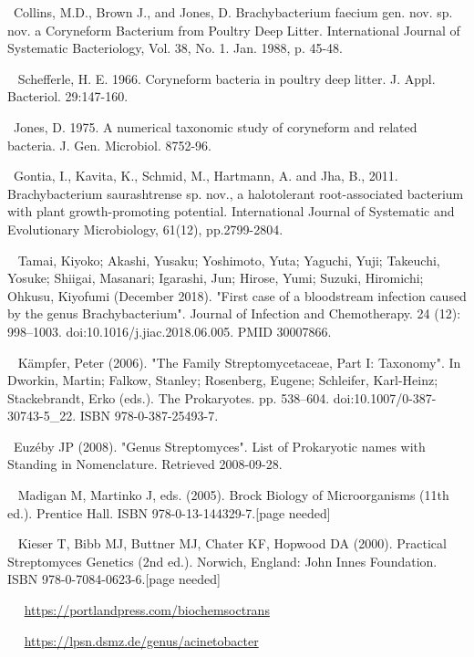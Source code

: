 \documentclass[11pt]{article}
\begin{document}
\begin{thebibliography}{3}
	~Collins, M.D., Brown J., and Jones, D. Brachybacterium faecium gen. nov. sp. nov. a Coryneform Bacterium from Poultry Deep Litter. International Journal of Systematic Bacteriology, Vol. 38, No. 1. Jan. 1988, p. 45-48.
	
	~ Schefferle, H. E. 1966. Coryneform bacteria in poultry deep litter. J. Appl. Bacteriol. 29:147-160.
	
	~Jones, D. 1975. A numerical taxonomic study of coryneform and related bacteria. J. Gen. Microbiol. 8752-96.
	
	~Gontia, I., Kavita, K., Schmid, M., Hartmann, A. and Jha, B., 2011. Brachybacterium saurashtrense sp. nov., a halotolerant root-associated bacterium with plant growth-promoting potential. International Journal of Systematic and Evolutionary Microbiology, 61(12), pp.2799-2804.
	
	~ Tamai, Kiyoko; Akashi, Yusaku; Yoshimoto, Yuta; Yaguchi, Yuji; Takeuchi, Yosuke; Shiigai, Masanari; Igarashi, Jun; Hirose, Yumi; Suzuki, Hiromichi; Ohkusu, Kiyofumi (December 2018). "First case of a bloodstream infection caused by the genus Brachybacterium". Journal of Infection and Chemotherapy. 24 (12): 998–1003. doi:10.1016/j.jiac.2018.06.005. PMID 30007866.

	~ Kämpfer, Peter (2006). "The Family Streptomycetaceae, Part I: Taxonomy". In Dworkin, Martin; Falkow, Stanley; Rosenberg, Eugene; Schleifer, Karl-Heinz; Stackebrandt, Erko (eds.). The Prokaryotes. pp. 538–604. doi:10.1007/0-387-30743-5\_22. ISBN 978-0-387-25493-7.
 
	~Euzéby JP (2008). "Genus Streptomyces". List of Prokaryotic names with Standing in Nomenclature. Retrieved 2008-09-28.

	~ Madigan M, Martinko J, eds. (2005). Brock Biology of Microorganisms (11th ed.). Prentice Hall. ISBN 978-0-13-144329-7.[page needed]

	~ Kieser T, Bibb MJ, Buttner MJ, Chater KF, Hopwood DA (2000). Practical Streptomyces Genetics (2nd ed.). Norwich, England: John Innes Foundation. ISBN 978-0-7084-0623-6.[page needed]

	~ ~\url{https://portlandpress.com/biochemsoctrans}
	
	~ ~\url{https://lpsn.dsmz.de/genus/acinetobacter}


\end{thebibliography}
\end{document}

